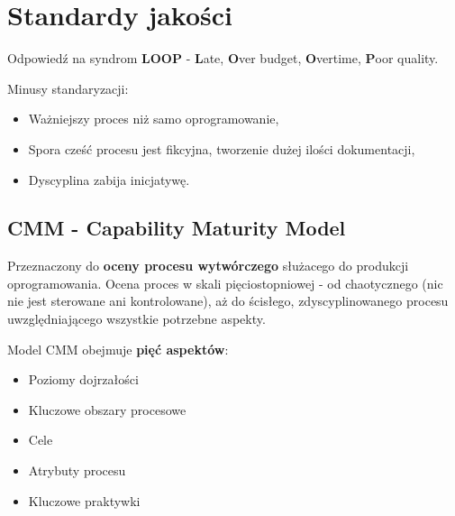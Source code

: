\documentclass[a4paper]{article}
\begin{document}
    \section{Standardy jakości}

    Odpowiedź na syndrom \textbf{LOOP} - \textbf{L}ate, \textbf{O}ver budget, \textbf{O}vertime, \textbf{P}oor quality.

    Minusy standaryzacji:
    \begin{itemize}
        \item Ważniejszy proces niż samo oprogramowanie,
        \item Spora cześć procesu jest fikcyjna, tworzenie dużej ilości dokumentacji,
        \item Dyscyplina zabija inicjatywę.
    \end{itemize}

    \subsection{CMM - Capability Maturity Model}
    Przeznaczony do \textbf{oceny procesu wytwórczego} służacego do produkcji oprogramowania.
    Ocena proces w skali pięciostopniowej - od chaotycznego (nic nie jest
    sterowane ani kontrolowane), aż do ścisłego, zdyscyplinowanego procesu uwzględniającego wszystkie potrzebne aspekty.

    Model CMM obejmuje \textbf{pięć aspektów}:
    \begin{itemize}
        \item Poziomy dojrzałości
        \item Kluczowe obszary procesowe
        \item Cele
        \item Atrybuty procesu
        \item Kluczowe praktywki
    \end{itemize}
\end{document}
